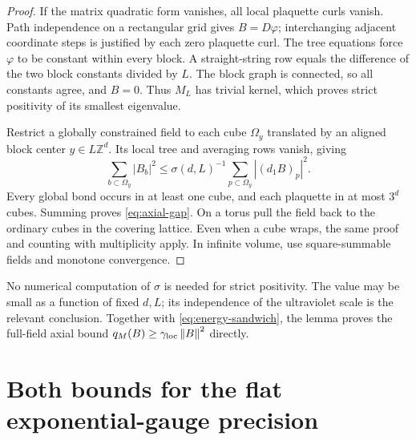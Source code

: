 \documentclass[11pt]{article}
\theoremstyle{remark}
\newcommand{\norm}[1]{\left\|#1\right\|}
\begin{document}
\begin{proof}
If the matrix quadratic form vanishes, all local plaquette curls
vanish. Path independence on a rectangular grid gives $B=D\varphi$;
interchanging adjacent coordinate steps is justified by each zero
plaquette curl. The tree equations force $\varphi$ to be constant
within every block. A straight-string row equals the difference of
the two block constants divided by $L$. The block graph is connected,
so all constants agree, and $B=0$. Thus $M_L$ has trivial kernel,
which proves strict positivity of its smallest eigenvalue.

Restrict a globally constrained field to each cube $\Omega_y$
translated by an aligned block center $y\in L\mathbb Z^d$.
Its local tree and averaging rows vanish, giving
\[
 \sum_{b\subset\Omega_y}|B_b|^2
 \le\sigma(d,L)^{-1}\sum_{p\subset\Omega_y}|(d_1B)_p|^2.
\]
Every global bond occurs in at least one cube, and each plaquette
in at most $3^d$ cubes. Summing proves \eqref{eq:axial-gap}.
On a torus pull the field back to the ordinary cubes in the covering
lattice. Even when a cube wraps, the same proof and counting with
multiplicity apply. In infinite volume, use square-summable fields
and monotone convergence.
\end{proof}

No numerical computation of $\sigma$ is needed for strict positivity.
The value may be small as a function of fixed $d,L$; its independence
of the ultraviolet scale is the relevant conclusion. Together with
\eqref{eq:energy-sandwich}, the lemma proves the full-field axial
bound $q_M(B)\ge\gamma_{\rm loc}\norm B^2$ directly.

\section{Both bounds for the flat exponential-gauge precision}
\end{document}
